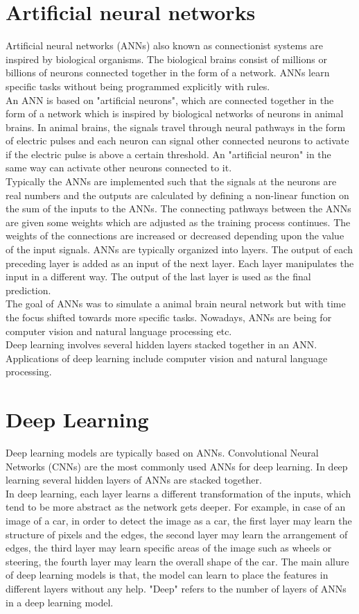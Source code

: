 \section{Artificial neural networks}
Artificial neural networks (ANNs) also known as connectionist systems are inspired by biological organisms. The biological brains consist of millions or billions of neurons connected together in the form of a network. ANNs learn specific tasks without being programmed explicitly with rules. \\
An ANN is based on "artificial neurons", which are connected together in the form of a network which is inspired by biological networks of neurons in animal brains. In animal brains, the signals travel through neural pathways in the form of electric pulses and each neuron can signal other connected neurons to activate if the electric pulse is above a certain threshold. An "artificial neuron" in the same way can activate other neurons connected to it. \\
Typically the ANNs are implemented such that the signals at the neurons are real numbers and the outputs are calculated by defining a non-linear function on the sum of the inputs to the ANNs. The connecting pathways between the ANNs are given some weights which are adjusted as the training process continues. The weights of the connections are increased or decreased depending upon the value of the input signals. ANNs are typically organized into layers. The output of each preceding layer is added as an input of the next layer. Each layer manipulates the input in a different way. The output of the last layer is used as the final prediction. \\
The goal of ANNs was to simulate a animal brain neural network but with time the focus shifted towards more specific tasks. Nowadays, ANNs are being for computer vision and natural language processing etc. \\
Deep learning involves several hidden layers stacked together in an ANN. Applications of deep learning include computer vision and natural language processing.

\section{Deep Learning}
Deep learning models are typically based on ANNs. Convolutional Neural Networks (CNNs) are the most commonly used ANNs for deep learning. In deep learning several hidden layers of ANNs are stacked together. \\
In deep learning, each layer learns a different transformation of the inputs, which tend to be more abstract as the network gets deeper. For example, in case of an image of a car, in order to detect the image as a car, the first layer may learn the structure of pixels and the edges, the second layer may learn the arrangement of edges, the third layer may learn specific areas of the image such as wheels or steering, the fourth layer may learn the overall shape of the car. The main allure of deep learning models is that, the model can learn to place the features in different layers without any help. "Deep" refers to the number of layers of ANNs in a deep learning model.

